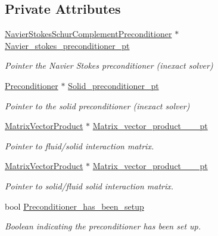 \subsection*{Private Attributes}
\begin{DoxyCompactItemize}
\item 
\hyperlink{classoomph_1_1NavierStokesSchurComplementPreconditioner}{Navier\+Stokes\+Schur\+Complement\+Preconditioner} $\ast$ \hyperlink{classoomph_1_1FSIPreconditioner_adc98903b78d0bc97c40eb733eaf6e498}{Navier\+\_\+stokes\+\_\+preconditioner\+\_\+pt}
\begin{DoxyCompactList}\small\item\em Pointer the Navier Stokes preconditioner (inexact solver) \end{DoxyCompactList}\item 
\hyperlink{classoomph_1_1Preconditioner}{Preconditioner} $\ast$ \hyperlink{classoomph_1_1FSIPreconditioner_a9a6616d03bd67e2c1c406bcb6d332893}{Solid\+\_\+preconditioner\+\_\+pt}
\begin{DoxyCompactList}\small\item\em Pointer to the solid preconditioner (inexact solver) \end{DoxyCompactList}\item 
\hyperlink{classoomph_1_1MatrixVectorProduct}{Matrix\+Vector\+Product} $\ast$ \hyperlink{classoomph_1_1FSIPreconditioner_a595acfea83abd9fd907c208f3b487f57}{Matrix\+\_\+vector\+\_\+product\+\_\+\_\+\_\+pt}
\begin{DoxyCompactList}\small\item\em Pointer to fluid/solid interaction matrix. \end{DoxyCompactList}\item 
\hyperlink{classoomph_1_1MatrixVectorProduct}{Matrix\+Vector\+Product} $\ast$ \hyperlink{classoomph_1_1FSIPreconditioner_a8b4161c521cb4160ae07bb0096eaca1c}{Matrix\+\_\+vector\+\_\+product\+\_\+\_\+\_\+pt}
\begin{DoxyCompactList}\small\item\em Pointer to solid/fluid solid interaction matrix. \end{DoxyCompactList}\item 
bool \hyperlink{classoomph_1_1FSIPreconditioner_ad8d4b031c62a4ec74fad432a6bf27346}{Preconditioner\+\_\+has\+\_\+been\+\_\+setup}
\begin{DoxyCompactList}\small\item\em Boolean indicating the preconditioner has been set up. \end{DoxyCompactList}\item 

\end{DoxyCompactItemize}

